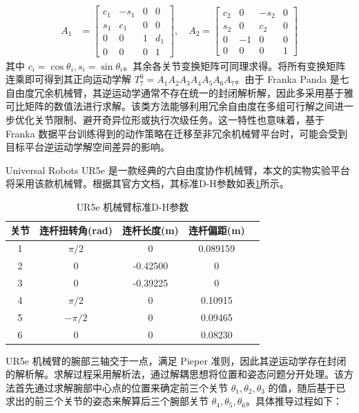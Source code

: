 \begin{equation}
\label{eq:panda_A1A2}
\begin{aligned}
A_1 &= \begin{bmatrix} c_1 & -s_1 & 0 & 0 \\ s_1 & c_1 & 0 & 0 \\ 0 & 0 & 1 & d_1 \\ 0 & 0 & 0 & 1 \end{bmatrix}, \quad
A_2 = \begin{bmatrix} c_2 & 0 & -s_2 & 0 \\ s_2 & 0 & c_2 & 0 \\ 0 & -1 & 0 & 0 \\ 0 & 0 & 0 & 1 \end{bmatrix}
\end{aligned}
\end{equation}
其中 $c_i = \cos\theta_i, s_i = \sin\theta_i$。其余各关节变换矩阵可同理求得。将所有变换矩阵连乘即可得到其正向运动学解 $T_7^0 = A_1 A_2 A_3 A_4 A_5 A_6 A_7$。由于 Franka Panda 是七自由度冗余机械臂，其逆运动学通常不存在统一的封闭解析解，因此多采用基于雅可比矩阵的数值法进行求解。该类方法能够利用冗余自由度在多组可行解之间进一步优化关节限制、避开奇异位形或执行次级任务。这一特性也意味着，基于 Franka 数据平台训练得到的动作策略在迁移至非冗余机械臂平台时，可能会受到目标平台逆运动学解空间差异的影响。


Universal Robots UR5e 是一款经典的六自由度协作机械臂，本文的实物实验平台将采用该款机械臂。根据其官方文档，其标准D-H参数如表\ref{tab:ur5_dh_parameters}所示。

\begin{table}[H]
  \centering
  \caption{UR5e 机械臂标准D-H参数}
  \label{tab:ur5_dh_parameters}
  \begin{tabular}{ccccc}
    \toprule
    关节 & 连杆扭转角(rad) & 连杆长度(m) & 连杆偏距(m)  \\
    \midrule
    1 & $\pi/2$ & 0 & 0.089159 \\
    2 & 0 & -0.42500 & 0 \\
    3 & 0 & -0.39225 & 0 \\
    4 & $\pi/2$ & 0 & 0.10915 \\
    5 & $-\pi/2$ & 0 & 0.09465 \\
    6 & 0 & 0 & 0.08230 \\
    \bottomrule
  \end{tabular}
\end{table}

UR5e 机械臂的腕部三轴交于一点，满足 Pieper 准则，因此其逆运动学存在封闭的解析解。求解过程采用解析法，通过解耦思想将位置和姿态问题分开处理。该方法首先通过求解腕部中心点的位置来确定前三个关节 $\theta_1, \theta_2, \theta_3$ 的值，随后基于已求出的前三个关节的姿态来解算后三个腕部关节 $\theta_4, \theta_5, \theta_6$。具体推导过程如下：

